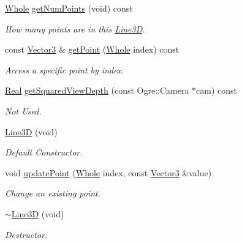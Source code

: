 \begin{DoxyCompactItemize}
\hyperlink{namespacephys_a460f6bc24c8dd347b05e0366ae34f34a}{Whole} \hyperlink{classphys_1_1internal_1_1Line3D_ab72a9dab3a355035c24c15e4a737ea2f}{getNumPoints} (void) const 
\begin{DoxyCompactList}\small\item\em How many points are in this \hyperlink{classphys_1_1internal_1_1Line3D}{Line3D}. \item\end{DoxyCompactList}\item 
const \hyperlink{classphys_1_1Vector3}{Vector3} \& \hyperlink{classphys_1_1internal_1_1Line3D_a190af0e38be28297ed2f6a7aecf0c316}{getPoint} (\hyperlink{namespacephys_a460f6bc24c8dd347b05e0366ae34f34a}{Whole} index) const 
\begin{DoxyCompactList}\small\item\em Access a specific point by index. \item\end{DoxyCompactList}\item 
\hyperlink{namespacephys_af7eb897198d265b8e868f45240230d5f}{Real} \hyperlink{classphys_1_1internal_1_1Line3D_a5d2622c10ef432e84cad59634dcee340}{getSquaredViewDepth} (const Ogre::Camera $\ast$cam) const 
\begin{DoxyCompactList}\small\item\em Not Used. \item\end{DoxyCompactList}\item 
\hyperlink{classphys_1_1internal_1_1Line3D_ab22b8f5fae0bb2585b1031adfff424bd}{Line3D} (void)
\begin{DoxyCompactList}\small\item\em Default Constructor. \item\end{DoxyCompactList}\item 
void \hyperlink{classphys_1_1internal_1_1Line3D_a4b2dec1619e4456ab0cb034ad34eb9d1}{updatePoint} (\hyperlink{namespacephys_a460f6bc24c8dd347b05e0366ae34f34a}{Whole} index, const \hyperlink{classphys_1_1Vector3}{Vector3} \&value)
\begin{DoxyCompactList}\small\item\em Change an existing point. \item\end{DoxyCompactList}\item 
\hyperlink{classphys_1_1internal_1_1Line3D_acddc95dd5f319d6afc68260af8bea39c}{$\sim$Line3D} (void)
\begin{DoxyCompactList}\small\item\em Destructor. \item\end{DoxyCompactList}\end{DoxyCompactItemize}
